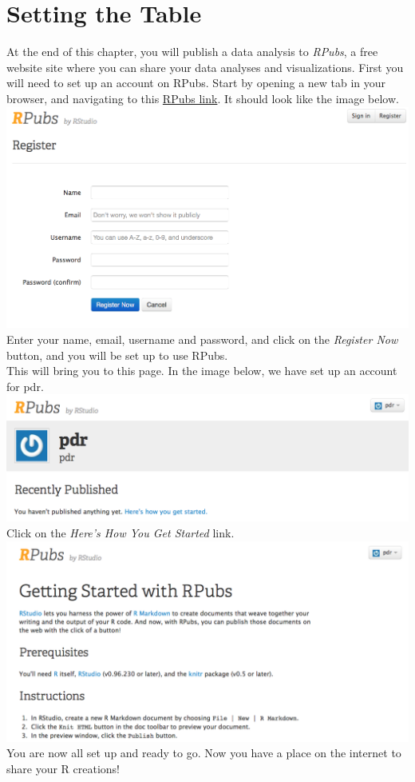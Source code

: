 \documentclass[
]{book}
\begin{document}
\hypertarget{setting-the-table}{%
\section{Setting the Table}\label{setting-the-table}}

At the end of this chapter, you will publish a data analysis to \emph{RPubs}, a free website site where you can share your data analyses and visualizations. First you will need to set up an account on RPubs. Start by opening a new tab in your browser, and navigating to this \href{https://rpubs.com/users/new}{RPubs link}. It should look like the image below.
\includegraphics{images/rpubs1.png}\\
Enter your name, email, username and password, and click on the \emph{Register Now} button, and you will be set up to use RPubs.\\
This will bring you to this page. In the image below, we have set up an account for pdr.\\
\includegraphics{images/rpubs2.png}
Click on the \emph{Here's How You Get Started} link.
\includegraphics{images/rpubs3.png}\\
You are now all set up and ready to go. Now you have a place on the internet to share your R creations!
\end{document}
